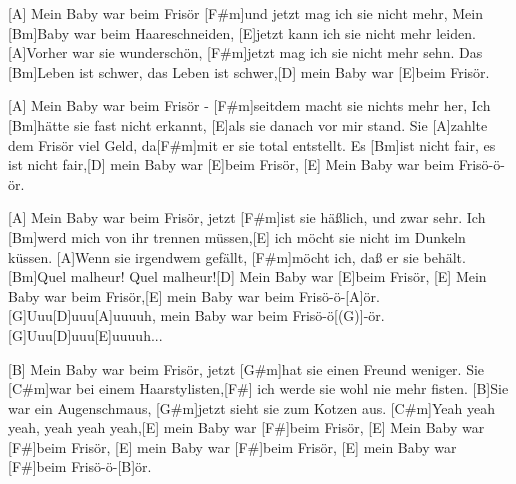 

\begin{guitar}
	\vspace*{-.05em}
	[A] Mein Baby war beim Frisör [F#m]und jetzt mag ich sie nicht mehr,
	Mein [Bm]Baby war beim Haareschneiden, [E]jetzt kann ich sie nicht mehr leiden.
	[A]Vorher war sie wunderschön, [F#m]jetzt mag ich sie nicht mehr sehn.
	Das [Bm]Leben ist schwer, das Leben ist schwer,[D] mein Baby war [E]beim Frisör.\vspace*{-.1em}
	
	\vspace*{-.05em}
	[A] Mein Baby war beim Frisör - [F#m]seitdem macht sie nichts mehr her,
	Ich [Bm]hätte sie fast nicht erkannt, [E]als sie danach vor mir stand.
	Sie [A]zahlte dem Frisör viel Geld, da[F#m]mit er sie total entstellt.
	Es [Bm]ist nicht fair, es ist nicht fair,[D] mein Baby war [E]beim Frisör,
	[E] Mein Baby war beim Frisö-ö-ör.\vspace*{-.1em}
	
	\vspace*{-.05em}
	[A] Mein Baby war beim Frisör, jetzt [F#m]ist sie häßlich, und zwar sehr.
	Ich [Bm]werd mich von ihr trennen müssen,[E] ich möcht sie nicht im Dunkeln küssen.
	[A]Wenn sie irgendwem gefällt, [F#m]möcht ich, daß er sie behält.
	[Bm]Quel malheur! Quel malheur![D] Mein Baby war [E]beim Frisör,
	[E] Mein Baby war beim Frisör,[E] mein Baby war beim Frisö-ö-[A]{ö}r.
	[G]Uuu[D]uuu[A]uuuuh, mein Baby war beim Frisö-ö[(G)]-ör. 
	[G]Uuu[D]uuu[E]uuuuh...\vspace*{-.1em}
	
	\vspace*{-.05em}
	[B] Mein Baby war beim Frisör, jetzt [G#m]hat sie einen Freund weniger.
	Sie [C#m]war bei einem Haarstylisten,[F#] ich werde sie wohl nie mehr fisten.
	[B]Sie war ein Augenschmaus, [G#m]jetzt sieht sie zum Kotzen aus. 
	[C#m]Yeah yeah yeah, yeah yeah yeah,[E] mein Baby war [F#]beim Frisör,
	[E] Mein Baby war [F#]beim Frisör, [E] mein Baby war [F#]beim Frisör,
	[E] mein Baby war [F#]beim Frisö-ö-[B]{ö}r.\hfill\end{guitar}